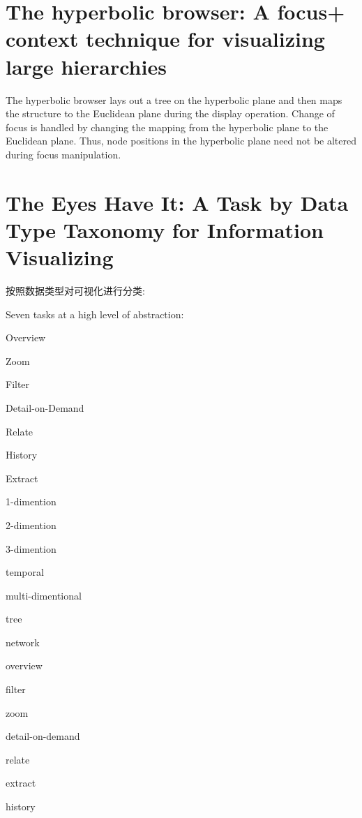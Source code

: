 \documentclass{article}
\begin{document}
\normalem
\section{The hyperbolic browser: A focus+ context technique for
	visualizing large hierarchies\cite{lamping1996hyperbolic}}

The hyperbolic browser lays out a tree on the hyperbolic plane and
then maps the structure to the Euclidean plane during the display operation.
Change of focus is handled by changing the mapping from the hyperbolic plane
to the Euclidean plane. Thus, node positions in the hyperbolic plane need not be
altered during focus manipulation.

\section{The Eyes Have It: A Task by Data Type Taxonomy
	for Information Visualizing\cite{shneiderman1996eyes}}

	按照数据类型对可视化进行分类:

	Seven tasks at a high level of abstraction:\\
	\begin{inparaenum}[\itshape 1)]
		\item Overview
		\item	Zoom
		\item	Filter
		\item	Detail-on-Demand
		\item	Relate
		\item	History
		\item	Extract
	\end{inparaenum}

	\begin{inparaenum}[\itshape 1)]
		\item 1-dimention
		\item 2-dimention
		\item 3-dimention
		\item temporal
		\item multi-dimentional
		\item tree
		\item network
		\item overview
		\item filter
		\item zoom
		\item detail-on-demand
		\item relate
		\item extract
		\item history
	\end{inparaenum}
\end{document}

